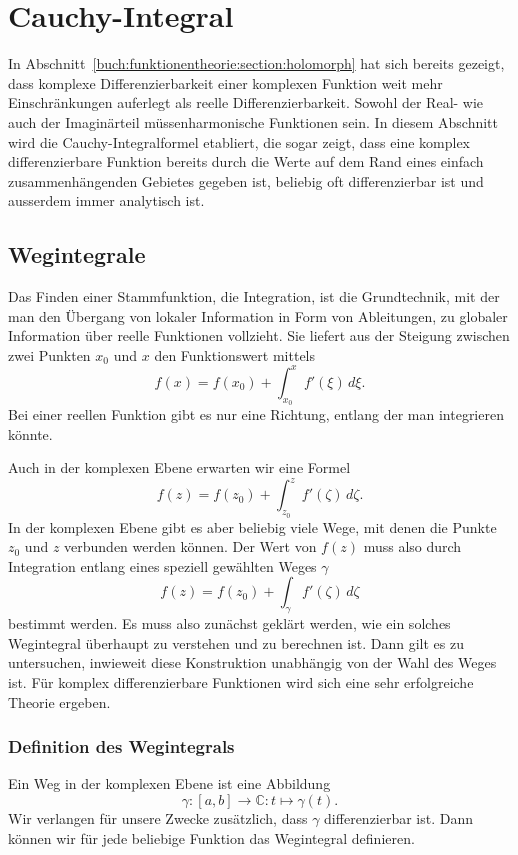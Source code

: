 %
%
%
\section{Cauchy-Integral
\label{buch:funktionentheorie:section:cauchy}}
In Abschnitt~\ref{buch:funktionentheorie:section:holomorph} hat sich
bereits gezeigt, dass komplexe Differenzierbarkeit einer komplexen
Funktion weit mehr Einschränkungen auferlegt als reelle Differenzierbarkeit.
Sowohl der Real- wie auch der Imaginärteil müssenharmonische Funktionen
sein.
In diesem Abschnitt wird die Cauchy-In\-te\-gral\-formel etabliert, die 
sogar zeigt, dass eine komplex differenzierbare Funktion bereits durch 
die Werte auf dem Rand eines einfach zusammenhängenden Gebietes
gegeben ist, beliebig oft differenzierbar ist und ausserdem immer
analytisch ist.

%
%
\subsection{Wegintegrale\label{subsection:wegintegrale}}
Das Finden einer Stammfunktion, die Integration, ist die Grundtechnik,
%
mit der man den Übergang von lokaler Information in Form von Ableitungen,
zu globaler Information über reelle Funktionen vollzieht.
Sie liefert aus der Steigung zwischen zwei Punkten $x_0$ und $x$ den
Funktionswert mittels
\[
f(x)=f(x_0)+\int_{x_0}^xf'(\xi)\,d\xi.
\]
Bei einer reellen Funktion gibt es nur eine Richtung, entlang der man
integrieren könnte.

Auch in der komplexen Ebene erwarten wir eine Formel
\[
f(z) = f(z_0) + \int_{z_0}^z f'(\zeta)\,d\zeta.
\]
In der komplexen Ebene gibt es aber beliebig viele Wege, mit denen die
Punkte $z_0$ und $z$ verbunden werden können.
Der Wert von $f(z)$ muss also durch Integration entlang eines speziell
gewählten Weges $\gamma$
\[
f(z) = f(z_0) + \int_{\gamma} f'(\zeta)\,d\zeta
\]
bestimmt werden.
Es muss also zunächst geklärt werden, wie ein solches Wegintegral
überhaupt zu verstehen und zu berechnen ist.
Dann gilt es zu untersuchen, inwieweit diese Konstruktion unabhängig
von der Wahl des Weges ist.
Für komplex differenzierbare Funktionen wird sich eine sehr erfolgreiche
Theorie ergeben.

%
%
\subsubsection{Definition des Wegintegrals}
Ein Weg in der komplexen Ebene ist eine Abbildung
%
\[
\gamma\colon [a,b]\to\mathbb C: t\mapsto \gamma(t).
\]
Wir verlangen für unsere Zwecke zusätzlich, dass $\gamma$ differenzierbar
ist.
Dann können wir für jede beliebige Funktion das Wegintegral definieren.

